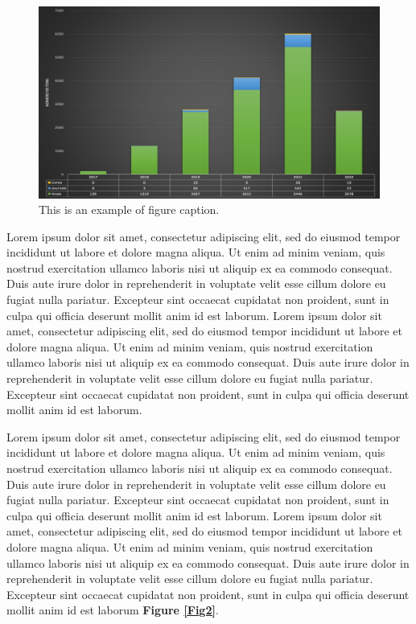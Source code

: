 \documentclass[english]{sbc2025}%
\begin{document}
\begin{figure}
\begin{center}
\includegraphics[width=\columnwidth]{sol.jpg}
\caption{This is an example of figure caption.}\label{Fig1}
\end{center}
\end{figure}

Lorem ipsum dolor sit amet, consectetur adipiscing elit, sed do eiusmod tempor incididunt ut labore et dolore magna aliqua. Ut enim ad minim veniam, quis nostrud exercitation ullamco laboris nisi ut aliquip ex ea commodo consequat. Duis aute irure dolor in reprehenderit in voluptate velit esse cillum dolore eu fugiat nulla pariatur. Excepteur sint occaecat cupidatat non proident, sunt in culpa qui officia deserunt mollit anim id est laborum. Lorem ipsum dolor sit amet, consectetur adipiscing elit, sed do eiusmod tempor incididunt ut labore et dolore magna aliqua. Ut enim ad minim veniam, quis nostrud exercitation ullamco laboris nisi ut aliquip ex ea commodo consequat. Duis aute irure dolor in reprehenderit in voluptate velit esse cillum dolore eu fugiat nulla pariatur. Excepteur sint occaecat cupidatat non proident, sunt in culpa qui officia deserunt mollit anim id est laborum.

Lorem ipsum dolor sit amet, consectetur adipiscing elit, sed do eiusmod tempor incididunt ut labore et dolore magna aliqua. Ut enim ad minim veniam, quis nostrud exercitation ullamco laboris nisi ut aliquip ex ea commodo consequat. Duis aute irure dolor in reprehenderit in voluptate velit esse cillum dolore eu fugiat nulla pariatur. Excepteur sint occaecat cupidatat non proident, sunt in culpa qui officia deserunt mollit anim id est laborum. Lorem ipsum dolor sit amet, consectetur adipiscing elit, sed do eiusmod tempor incididunt ut labore et dolore magna aliqua. Ut enim ad minim veniam, quis nostrud exercitation ullamco laboris nisi ut aliquip ex ea commodo consequat. Duis aute irure dolor in reprehenderit in voluptate velit esse cillum dolore eu fugiat nulla pariatur. Excepteur sint occaecat cupidatat non proident, sunt in culpa qui officia deserunt mollit anim id est laborum \textbf{Figure \ref{Fig2}}.
\end{document}
